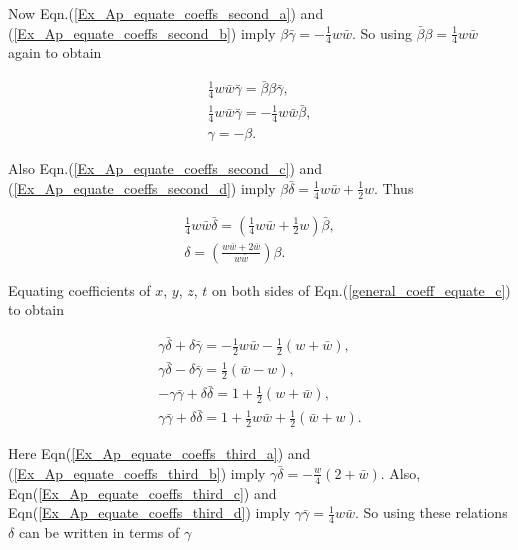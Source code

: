 \begin{appendix}
\noindent Now Eqn.(\ref{Ex_Ap_equate_coeffs_second_a}) and (\ref{Ex_Ap_equate_coeffs_second_b}) imply $\beta \bar{\gamma} = -\frac{1}{4}w\bar{w}$. So using $\bar{\beta} \beta= \frac{1}{4}w\bar{w}$ again to obtain

\begin{gather*}
\frac{1}{4}w\bar{w} \bar{\gamma} = \bar{\beta}\beta\bar{\gamma},\\
\frac{1}{4}w\bar{w} \bar{\gamma} = -\frac{1}{4}w\bar{w} \bar{\beta},\\
\gamma = -\beta.
\end{gather*}

\noindent Also Eqn.(\ref{Ex_Ap_equate_coeffs_second_c}) and (\ref{Ex_Ap_equate_coeffs_second_d}) imply $\beta \bar{\delta} = \frac{1}{4}w\bar{w} + \frac{1}{2}w$. Thus

\begin{gather*}
\frac{1}{4}w\bar{w}\bar{\delta} = \left(\frac{1}{4}w\bar{w}+ \frac{1}{2}w\right)\bar{\beta},\\
\delta = \left(\frac{w\bar{w} + 2\bar{w}}{w\bar{w}}\right)\beta.
\end{gather*}

\noindent Equating coefficients of $x$, $y$, $z$, $t$ on both sides of Eqn.(\ref{general_coeff_equate_c}) to obtain

\begin{subequations}
\begin{gather}\label{Ex_Ap_equate_coeffs_third_a}
\gamma \bar{\delta} + \delta \bar{\gamma} = -\frac{1}{2}w\bar{w} - \frac{1}{2}(w + \bar{w}), \\\label{Ex_Ap_equate_coeffs_third_b}
\gamma \bar{\delta} - \delta \bar{\gamma} =  \frac{1}{2}(\bar{w}-w),\\\label{Ex_Ap_equate_coeffs_third_c}
-\gamma \bar{\gamma} + \delta \bar{\delta} = 1 + \frac{1}{2}(w + \bar{w}),\\\label{Ex_Ap_equate_coeffs_third_d}
\gamma \bar{\gamma} + \delta \bar{\delta} = 1 + \frac{1}{2}w\bar{w} + \frac{1}{2}(\bar{w}+w). 
\end{gather}
\end{subequations}

\noindent Here Eqn(\ref{Ex_Ap_equate_coeffs_third_a}) and (\ref{Ex_Ap_equate_coeffs_third_b}) imply $\gamma \bar{\delta} = -\frac{w}{4}(2+\bar{w})$. Also, Eqn(\ref{Ex_Ap_equate_coeffs_third_c}) and Eqn(\ref{Ex_Ap_equate_coeffs_third_d}) imply $\gamma \bar{\gamma} = \frac{1}{4}w\bar{w}$. So using these relations $\delta$ can be written in terms of $\gamma$ 


\end{appendix}
